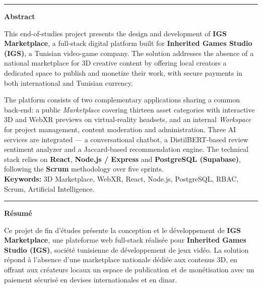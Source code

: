 \thispagestyle{empty}

\noindent\rule{\textwidth}{1.5pt}

\vspace{0.1cm}
\begin{center}{\bfseries\large\color{isiBlue} Abstract}\end{center}
\vspace{0.05cm}
\footnotesize
\setlength{\parskip}{4pt}

This end-of-studies project presents the design and development of \textbf{IGS Marketplace},
a full-stack digital platform built for \textbf{Inherited Games Studio (IGS)}, a Tunisian
video-game company. The solution addresses the absence of a national marketplace for
3D creative content by offering local creators a dedicated space to publish and monetize
their work, with secure payments in both international and Tunisian currency.

The platform consists of two complementary applications sharing a common back-end: a
public \textit{Marketplace} covering thirteen asset categories with interactive 3D and
WebXR previews on virtual-reality headsets, and an internal \textit{Workspace} for
project management, content moderation and administration. Three AI services are
integrated --- a conversational chatbot, a DistilBERT-based review sentiment analyzer
and a Jaccard-based recommendation engine. The technical stack relies on \textbf{React},
\textbf{Node.js / Express} and \textbf{PostgreSQL (Supabase)}, following the \textbf{Scrum}
methodology over five sprints.\\[1pt]
\textbf{Keywords:} 3D Marketplace, WebXR, React, Node.js, PostgreSQL, RBAC, Scrum, Artificial Intelligence.

\noindent\rule{\textwidth}{0.4pt}

\vspace{0.1cm}
\begin{center}{\bfseries\large\color{isiBlue} Résumé}\end{center}
\vspace{0.05cm}
\footnotesize

Ce projet de fin d'études présente la conception et le développement de
\textbf{IGS Marketplace}, une plateforme web full-stack réalisée pour
\textbf{Inherited Games Studio (IGS)}, société tunisienne de développement de jeux vidéo.
La solution répond à l'absence d'une marketplace nationale dédiée aux contenus 3D, en
offrant aux créateurs locaux un espace de publication et de monétisation avec un
paiement sécurisé en devises internationales et en dinar.

